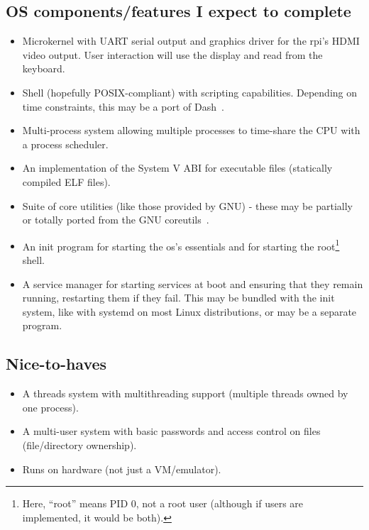 \documentclass{article}
\begin{document}
\subsection*{OS components/features I expect to complete}
\begin{itemize}
    \item Microkernel with UART serial output and graphics driver for the \gls{rpi}'s
        HDMI video output. User interaction will use the display and read from
        the keyboard.
    \item Shell (hopefully POSIX-compliant) with scripting capabilities.
        Depending on time constraints, this may be a port of
        Dash~\cite{dash-shell}.
    \item Multi-process system allowing multiple processes to time-share the
        CPU with a process scheduler.
    \item An implementation of the System V ABI for executable files
        (statically compiled ELF files).
    \item Suite of core utilities (like those provided by GNU) - these may be
        partially or totally ported from the GNU
        coreutils~\cite{gnu-coreutils}.
    \item An init program for starting the \gls{os}'s essentials and for starting the
        root\footnote{Here, ``root'' means PID 0, not a root user (although if
        users are implemented, it would be both).} shell.
    \item A service manager for starting services at boot and ensuring that
        they remain running, restarting them if they fail. This may be bundled
        with the init system, like with systemd on most Linux distributions, or
        may be a separate program.
\end{itemize}

\subsection*{Nice-to-haves}
\begin{itemize}
    \item A threads system with multithreading support (multiple threads owned
        by one process).
    \item A multi-user system with basic passwords and access control on files
        (file/directory ownership).
    \item Runs on hardware (not just a VM/emulator).
\end{itemize}
\end{document}
